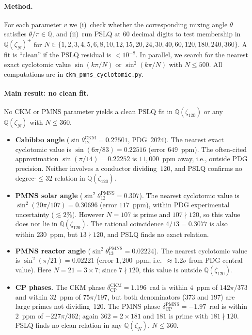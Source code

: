 \documentclass[11pt]{article}
\theoremstyle{remark}
\begin{document}
\paragraph{Method.}
For each parameter $v$ we (i)~check whether the corresponding mixing angle
$\theta$ satisfies $\theta/\pi \in \mathbb{Q}$, and (ii)~run PSLQ at 60
decimal digits to test membership in $\mathbb{Q}(\zeta_N)^+$ for
$N \in \{1,2,3,4,5,6,8,10,12,15,20,24,30,40,60,120,180,240,360\}$.
A fit is ``clean'' if the PSLQ residual is $<10^{-8}$.
In parallel, we search for the nearest exact cyclotomic value
$\sin(k\pi/N)$ or $\sin^2(k\pi/N)$ with $N \leq 500$.
All computations are in \texttt{ckm\_pmns\_cyclotomic.py}.

\paragraph{Main result: no clean fit.}
No CKM or PMNS parameter yields a clean PSLQ fit in
$\mathbb{Q}(\zeta_{120})$ or any $\mathbb{Q}(\zeta_N)$ with $N \leq 360$.

\begin{itemize}

\item \textbf{Cabibbo angle} ($\sin\theta_{12}^{\mathrm{CKM}} = 0.22501$,
  PDG~2024).  The nearest exact cyclotomic value is
  $\sin(6\pi/83) = 0.22516$ (error $649$~ppm).  The often-cited approximation
  $\sin(\pi/14) = 0.22252$ is $11{,}000$~ppm away, i.e., outside PDG
  precision.  Neither involves a conductor dividing~$120$, and PSLQ
  confirms no degree-$\leq 32$ relation in $\mathbb{Q}(\zeta_{120})$.

\item \textbf{PMNS solar angle} ($\sin^2\!\theta_{12}^{\mathrm{PMNS}} =
  0.307$).  The nearest cyclotomic value is $\sin^2(20\pi/107) = 0.30696$
  (error $117$~ppm), within PDG experimental uncertainty ($\lesssim 2\%$).
  However $N = 107$ is prime and $107 \nmid 120$, so this value does not
  lie in $\mathbb{Q}(\zeta_{120})$.  The rational coincidence $4/13 =
  0.3077$ is also within $230$~ppm, but $13 \nmid 120$, and PSLQ
  finds no exact relation.

\item \textbf{PMNS reactor angle} ($\sin^2\!\theta_{13}^{\mathrm{PMNS}} =
  0.02224$).  The nearest cyclotomic value is $\sin^2(\pi/21) = 0.02221$
  (error $1{,}200$~ppm, i.e.\ $\approx 1.2\sigma$ from PDG central value).
  Here $N = 21 = 3 \times 7$; since $7 \nmid 120$, this value is outside
  $\mathbb{Q}(\zeta_{120})$.

\item \textbf{CP phases.}  The CKM phase $\delta_{\mathrm{CP}}^{\mathrm{CKM}}
  = 1.196$~rad is within $4$~ppm of $142\pi/373$ and within $32$~ppm of
  $75\pi/197$, but both denominators ($373$ and $197$) are large primes
  not dividing~$120$.  The PMNS phase $\delta_{\mathrm{CP}}^{\mathrm{PMNS}}
  = -1.97$~rad is within $2$~ppm of $-227\pi/362$; again $362 = 2 \times
  181$ and $181$ is prime with $181 \nmid 120$.  PSLQ finds no clean
  relation in any $\mathbb{Q}(\zeta_N)$, $N \leq 360$.

\end{itemize}
\end{document}
